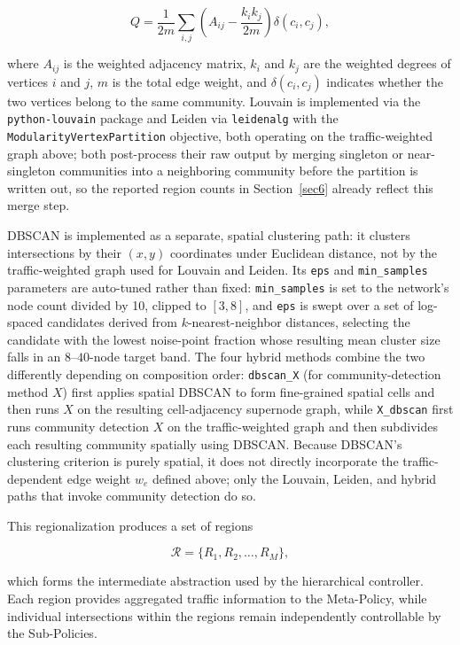 \documentclass[3p,times]{elsarticle}
\theoremstyle{plain}
\theoremstyle{definition}
\begin{document}
\begin{equation}
Q = \frac{1}{2m}\sum_{i,j}
\left(A_{ij} - \frac{k_i k_j}{2m}\right)
\delta(c_i, c_j),
\end{equation}

where $A_{ij}$ is the weighted adjacency matrix, $k_i$ and $k_j$ are
the weighted degrees of vertices $i$ and $j$, $m$ is the total edge
weight, and $\delta(c_i, c_j)$ indicates whether the two vertices
belong to the same community. Louvain is implemented via the
\texttt{python-louvain} package and Leiden via \texttt{leidenalg} with
the \texttt{ModularityVertexPartition} objective, both operating on the
traffic-weighted graph above; both post-process their raw output by
merging singleton or near-singleton communities into a neighboring
community before the partition is written out, so the reported region
counts in Section~\ref{sec6} already reflect this merge step.

DBSCAN is implemented as a separate, spatial clustering path: it
clusters intersections by their $(x,y)$ coordinates under Euclidean
distance, not by the traffic-weighted graph used for Louvain and
Leiden. Its \texttt{eps} and \texttt{min\_samples} parameters are
auto-tuned rather than fixed: \texttt{min\_samples} is set to the
network's node count divided by 10, clipped to $[3,8]$, and
\texttt{eps} is swept over a set of log-spaced candidates derived from
$k$-nearest-neighbor distances, selecting the candidate with the
lowest noise-point fraction whose resulting mean cluster size falls in
an $8$--$40$-node target band. The four hybrid methods combine the two
differently depending on composition order: \texttt{dbscan\_X} (for
community-detection method $X$) first applies spatial DBSCAN to form
fine-grained spatial cells and then runs $X$ on the resulting
cell-adjacency supernode graph, while \texttt{X\_dbscan} first runs
community detection $X$ on the traffic-weighted graph and then
subdivides each resulting community spatially using DBSCAN. Because
DBSCAN's clustering criterion is purely spatial, it does not directly
incorporate the traffic-dependent edge weight $w_e$ defined above; only
the Louvain, Leiden, and hybrid paths that invoke community detection
do so.

This regionalization produces a set of regions

\begin{equation}
\mathcal{R} = \{R_1, R_2, \ldots, R_M\},
\end{equation}

which forms the intermediate abstraction used by the hierarchical
controller. Each region provides aggregated traffic information to the
Meta-Policy, while individual intersections within the regions remain
independently controllable by the Sub-Policies.
\end{document}
